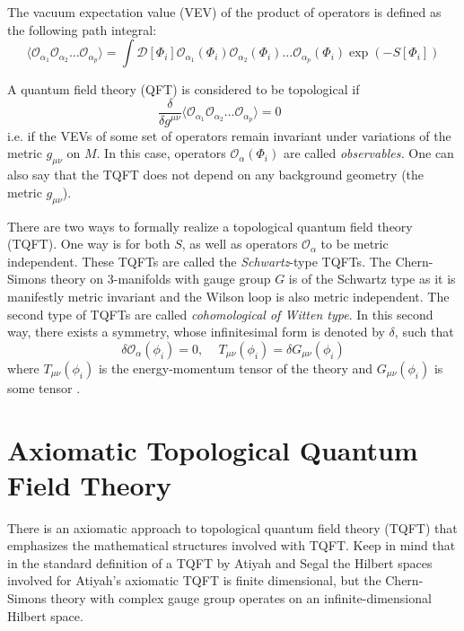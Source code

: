 \documentclass[a4paper,titlepage,twoside]{book}
\begin{document}
The vacuum expectation value (VEV) of the product of operators is defined as the following path integral:
\[
\langle \mathcal{O}_{\alpha_1} \mathcal{O}_{\alpha_2} \dots \mathcal{O}_{\alpha_p} \rangle = \int \mathcal{D}[\Phi_i] \mathcal{O}_{\alpha_1}(\Phi_i) \mathcal{O}_{\alpha_2}(\Phi_i) \dots \mathcal{O}_{\alpha_p}( \Phi_i) \exp{ \left( -S[\Phi_i ] \right) }
\]

A quantum field theory (QFT) is considered to be topological \cite{IvancevicIvancevic2008} if 
\begin{equation}
\frac{ \delta}{ \delta g^{\mu \nu }} \langle \mathcal{O}_{\alpha_1} \mathcal{O}_{\alpha_2} \dots \mathcal{O}_{\alpha_p} \rangle = 0 \quad \quad \, \label{Eq:defTQFT00}
\end{equation}
i.e. if the VEVs of some set of operators remain invariant under variations of the metric $g_{\mu \nu}$ on $M$.  In this case, operators $\mathcal{O}_{\alpha}(\Phi_i)$ are called \emph{observables.} One can also say that the TQFT does not depend on any background geometry (the metric $g_{\mu \nu}$). 

There are two ways to formally realize a topological quantum field theory (TQFT).  One way is for both $S$, as well as operators $\mathcal{O}_{\alpha}$ to be metric independent.  These TQFTs are called the \emph{Schwartz}-type TQFTs.  The Chern-Simons theory on 3-manifolds with gauge group $G$ is of the Schwartz type as it is manifestly metric invariant and the Wilson loop is also metric independent.  The second type of TQFTs are called \emph{cohomological of Witten type}.  In this second way, there exists a symmetry, whose infinitesimal form is denoted by $\delta$, such that
\[
\delta \mathcal{O}_{\alpha}{ (\phi_i)} =0, \quad \, T_{\mu \nu}{ (\phi_i)} = \delta G_{\mu \nu}{ (\phi_i)}
\]
where $T_{\mu\nu}{(\phi_i)}$ is the energy-momentum tensor of the theory and $G_{\mu\nu}{(\phi_i)}$ is some tensor \cite{IvancevicIvancevic2008}. 


\section{Axiomatic Topological Quantum Field Theory}\label{sec:ATQFT}

There is an axiomatic approach to topological quantum field theory (TQFT) that emphasizes the mathematical structures involved with TQFT.  Keep in mind that in the standard definition of a TQFT by Atiyah and Segal \cite{Atiyah1990} the Hilbert spaces involved for Atiyah's axiomatic TQFT is finite dimensional, but the Chern-Simons theory with complex gauge group operates on an infinite-dimensional Hilbert space.  
\end{document}
